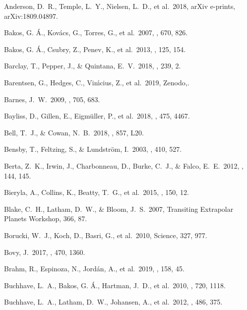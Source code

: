  Anderson, D.~R., Temple, L.~Y., Nielsen, L.~D., et al.\ 2018, arXiv e-prints, arXiv:1809.04897.

 Bakos, G. {\'A}., Kov{\'a}cs, G., Torres, G., et al.\ 2007, \apj, 670, 826.

 Bakos, G. {\'A}., Csubry, Z., Penev, K., et al.\ 2013, \pasp, 125, 154.

 Barclay, T., Pepper, J., \& Quintana, E.~V.\ 2018, \apjs, 239, 2.

 Barentsen, G., Hedges, C., Vin{\'\i}cius, Z., et al.\ 2019, Zenodo,.

 Barnes, J.~W.\ 2009, \apj, 705, 683.

 Bayliss, D., Gillen, E., Eigm{\"u}ller, P., et al.\ 2018, \mnras, 475, 4467.

 Bell, T.~J., \& Cowan, N.~B.\ 2018, \apjl, 857, L20.

 Bensby, T., Feltzing, S., \& Lundstr{\"o}m, I.\ 2003, \aap, 410, 527.

 Berta, Z.~K., Irwin, J., Charbonneau, D., Burke, C.~J., \& Falco, E.~E.\ 2012, \aj, 144, 145.

 Bieryla, A., Collins, K., Beatty, T.~G., et al.\ 2015, \aj, 150, 12.

 Blake, C.~H., Latham, D.~W., \& Bloom, J.~S.\ 2007, Transiting Extrapolar Planets Workshop, 366, 87.

 Borucki, W.~J., Koch, D., Basri, G., et al.\ 2010, Science, 327, 977.

 Bovy, J.\ 2017, \mnras, 470, 1360.

 Brahm, R., Espinoza, N., Jord{\'a}n, A., et al.\ 2019, \aj, 158, 45.

 Buchhave, L.~A., Bakos, G. {\'A}., Hartman, J.~D., et al.\ 2010, \apj, 720, 1118.

 Buchhave, L.~A., Latham, D.~W., Johansen, A., et al.\ 2012, \nat, 486, 375.

